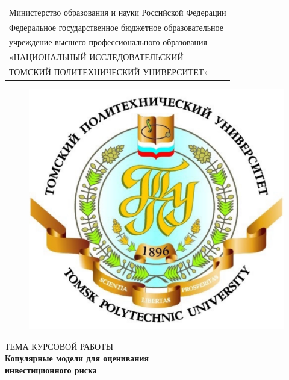 \begin{titlepage}

\begin{table}[t]
    \centering
    \begin{tabularx}{\textwidth}{>{\setlength{\hsize}{\hsize}}Y}
        Министерство образования и науки Российской Федерации \\
        Федеральное государственное бюджетное образовательное \\ 
        учреждение высшего профессионального образования \\
        «НАЦИОНАЛЬНЫЙ ИССЛЕДОВАТЕЛЬСКИЙ \\
        ТОМСКИЙ ПОЛИТЕХНИЧЕСКИЙ УНИВЕРСИТЕТ» \\
        \hline
    \end{tabularx}
\end{table}

\begin{figure}[h]
\centering
\includegraphics[width=0.2\textheight]{content/oldlogo.pdf}
\end{figure}

\begin{center}
ТЕМА КУРСОВОЙ РАБОТЫ\\
\large{\textbf{Копулярные модели для оценивания\\инвестиционного риска}}
\end{center}


\end{titlepage}
